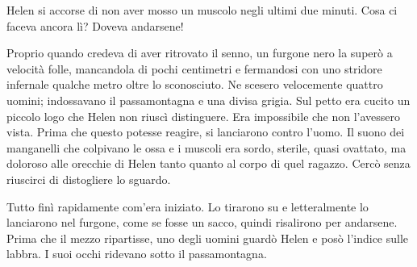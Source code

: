 Helen si accorse di non aver mosso un muscolo negli ultimi due minuti. Cosa ci faceva ancora lì?
Doveva andarsene!

Proprio quando credeva di aver ritrovato il senno, un furgone nero la superò a velocità folle,
mancandola di pochi centimetri e fermandosi con uno stridore infernale qualche metro oltre lo
sconosciuto. Ne scesero velocemente quattro uomini; indossavano il passamontagna e una divisa
grigia. Sul petto era cucito un piccolo logo che Helen non riuscì distinguere. Era impossibile che
non l'avessero vista. Prima che questo potesse reagire, si lanciarono contro l'uomo. Il suono dei
manganelli che colpivano le ossa e i muscoli era sordo, sterile, quasi ovattato, ma doloroso alle
orecchie di Helen tanto quanto al corpo di quel ragazzo. Cercò senza riuscirci di distogliere lo
sguardo.

Tutto finì rapidamente com'era iniziato. Lo tirarono su e letteralmente lo lanciarono nel furgone,
come se fosse un sacco, quindi risalirono per andarsene. Prima che il mezzo ripartisse, uno degli
uomini guardò Helen e posò l'indice sulle labbra. I suoi occhi ridevano sotto il passamontagna.

